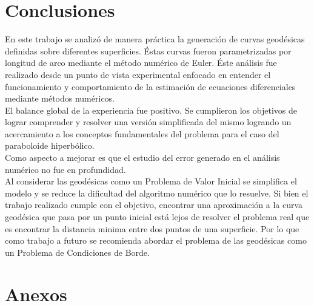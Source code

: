 \documentclass{endm}
\begin{document}
\section{Conclusiones}\label{Conclusiones}


En este trabajo se analiz\'o de manera pr\'actica la generaci\'on de curvas geod\'esicas definidas sobre diferentes superficies. \'Estas curvas fueron parametrizadas por longitud de arco mediante el m\'etodo num\'erico de Euler. \'Este an\'alisis fue realizado desde un punto de vista experimental enfocado en entender el funcionamiento y comportamiento de la estimaci\'on de ecuaciones diferenciales mediante m\'etodos num\'ericos. \\

El balance global de la experiencia fue positivo. Se cumplieron los objetivos de lograr comprender y resolver una versi\'on simplificada del mismo logrando un acercamiento a los conceptos fundamentales del problema para el caso del paraboloide hiperb\'olico.\\
Como aspecto a mejorar es que el estudio del error generado en el an\'alisis num\'erico no fue en profundidad.\\

Al considerar las geod\'esicas como un Problema de Valor Inicial se simplifica el modelo y se reduce la dificultad del algoritmo num\'erico que lo resuelve. Si bien el trabajo realizado cumple con el objetivo, encontrar una aproximaci\'on a la curva geod\'esica que pasa por un punto inicial est\'a lejos de resolver el problema real que es encontrar la distancia minima entre dos puntos de una superficie.  Por lo que como trabajo a futuro se recomienda abordar el problema de las geod\'esicas como un Problema de Condiciones de Borde.






%


\newpage

\section*{Anexos}
\end{document}
